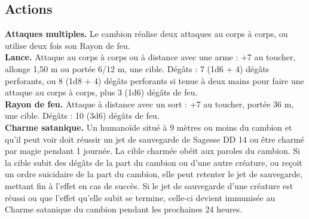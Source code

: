 \begin{figure*}[hb!]
{\begin{minipage}[c]{.45\linewidth}
    \subsection*{Actions}
    {\bfseries Attaques multiples.} Le cambion réalise deux attaques au corps à corps, ou utilise deux fois son Rayon de feu. \\
    {\bfseries Lance.} Attaque au corps à corps ou à distance avec une arme : +7 au toucher, allonge 1,50 m ou portée 6/12 m, une cible. Dégâts : 7 (1d6 + 4) dégâts perforants, ou 8 (1d8 + 4) dégâts perforants si tenue à deux mains pour faire une attaque au corps à corps, plus 3 (1d6) dégâts de feu. \\
    {\bfseries Rayon de feu.} Attaque à distance avec un sort : +7 au toucher, portée 36 m, une cible. Dégâts : 10 (3d6) dégâts de feu. \\
    {\bfseries Charme satanique.} Un humanoïde situé à 9 mètres ou moins du cambion et qu'il peut voir doit réussir un jet de sauvegarde de Sagesse DD 14 ou être charmé par magie pendant 1 journée. La cible charmée obéit aux paroles du cambion. Si la cible subit des dégâts de la part du cambion ou d'une autre créature, ou reçoit un ordre suicidaire de la part du cambion, elle peut retenter le jet de sauvegarde, mettant fin à l'effet en cas de succès. Si le jet de sauvegarde d'une créature est réussi ou que l'effet qu'elle subit se termine, celle-ci devient immunisée au Charme satanique du cambion pendant les prochaines 24 heures. \\
  \end{minipage}
}%
\end{figure*}


